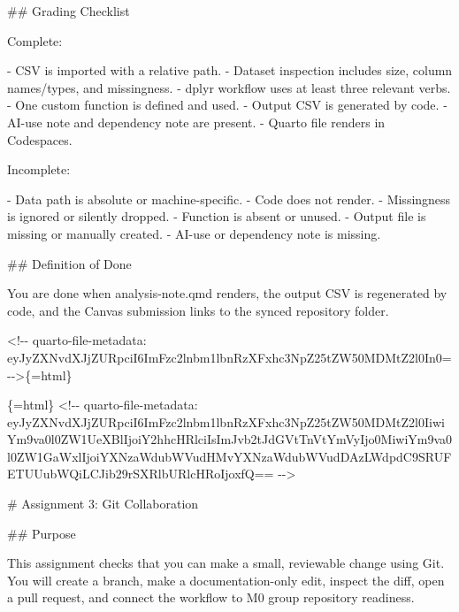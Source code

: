 \documentclass[
  letterpaper,
  DIV=11,
  numbers=noendperiod,
  oneside]{scrreprt}
\newenvironment{Shaded}{\begin{snugshade}}{\end{snugshade}}
\newcommand{\FunctionTok}[1]{\textcolor[rgb]{0.28,0.35,0.67}{#1}}
\newcommand{\InformationTok}[1]{\textcolor[rgb]{0.37,0.37,0.37}{#1}}
\newcommand{\NormalTok}[1]{\textcolor[rgb]{0.00,0.23,0.31}{#1}}
\newcommand{\SpecialStringTok}[1]{\textcolor[rgb]{0.13,0.47,0.30}{#1}}
\begin{document}
\begin{Shaded}
\begin{Highlighting}[numbers=left,,]
\FunctionTok{\#\# Grading Checklist}

\NormalTok{Complete:}

\SpecialStringTok{{-} }\NormalTok{CSV is imported with a relative path.}
\SpecialStringTok{{-} }\NormalTok{Dataset inspection includes size, column names/types, and missingness.}
\SpecialStringTok{{-} }\InformationTok{\textasciigrave{}dplyr\textasciigrave{}}\NormalTok{ workflow uses at least three relevant verbs.}
\SpecialStringTok{{-} }\NormalTok{One custom function is defined and used.}
\SpecialStringTok{{-} }\NormalTok{Output CSV is generated by code.}
\SpecialStringTok{{-} }\NormalTok{AI{-}use note and dependency note are present.}
\SpecialStringTok{{-} }\NormalTok{Quarto file renders in Codespaces.}

\NormalTok{Incomplete:}

\SpecialStringTok{{-} }\NormalTok{Data path is absolute or machine{-}specific.}
\SpecialStringTok{{-} }\NormalTok{Code does not render.}
\SpecialStringTok{{-} }\NormalTok{Missingness is ignored or silently dropped.}
\SpecialStringTok{{-} }\NormalTok{Function is absent or unused.}
\SpecialStringTok{{-} }\NormalTok{Output file is missing or manually created.}
\SpecialStringTok{{-} }\NormalTok{AI{-}use or dependency note is missing.}

\FunctionTok{\#\# Definition of Done}

\NormalTok{You are done when }\InformationTok{\textasciigrave{}analysis{-}note.qmd\textasciigrave{}}\NormalTok{ renders, the output CSV is regenerated by code, and the Canvas submission links to the synced repository folder.}


\InformationTok{\textasciigrave{}\textless{}!{-}{-} quarto{-}file{-}metadata: eyJyZXNvdXJjZURpciI6ImFzc2lnbm1lbnRzXFxhc3NpZ25tZW50MDMtZ2l0In0= {-}{-}\textgreater{}\textasciigrave{}}\NormalTok{\{=html\}}

\InformationTok{\textasciigrave{}\textasciigrave{}\textasciigrave{}\{=html\}}
\InformationTok{\textless{}!{-}{-} quarto{-}file{-}metadata: eyJyZXNvdXJjZURpciI6ImFzc2lnbm1lbnRzXFxhc3NpZ25tZW50MDMtZ2l0IiwiYm9va0l0ZW1UeXBlIjoiY2hhcHRlciIsImJvb2tJdGVtTnVtYmVyIjo0MiwiYm9va0l0ZW1GaWxlIjoiYXNzaWdubWVudHMvYXNzaWdubWVudDAzLWdpdC9SRUFETUUubWQiLCJib29rSXRlbURlcHRoIjoxfQ== {-}{-}\textgreater{}}
\InformationTok{\textasciigrave{}\textasciigrave{}\textasciigrave{}}

\FunctionTok{\# Assignment 3: Git Collaboration }


\FunctionTok{\#\# Purpose}

\NormalTok{This assignment checks that you can make a small, reviewable change using Git. You will create a branch, make a documentation{-}only edit, inspect the diff, open a pull request, and connect the workflow to M0 group repository readiness.}


\end{Highlighting}
\end{Shaded}
\end{document}
